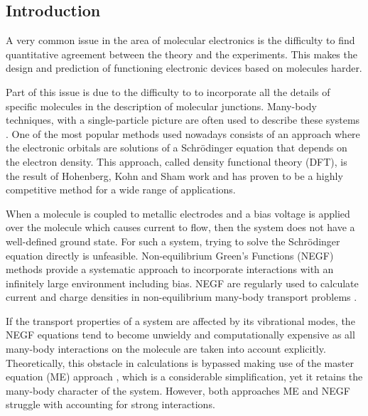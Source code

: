 \documentclass{article}
\begin{document}
\begin{multicols}{2}
        
    \section{Introduction}
        A very common issue in the area of molecular electronics is the difficulty to find quantitative agreement between the theory and the experiments. This makes the design and prediction of functioning electronic devices based on molecules harder.
        
        Part of this issue is due to the difficulty to to incorporate all the details of specific molecules in the description of molecular junctions. Many-body techniques, with a single-particle picture are often used to describe these systems \cite{Tsuneda2014}. One of the most popular methods used nowadays consists of an approach where the electronic orbitals are solutions of a Schr\"odinger equation that depends on the electron density. This approach, called density functional theory (DFT), is the result of Hohenberg, Kohn and Sham work \cite{Hohenberg1964, kohnsham, nobel1998} and has proven to be a highly competitive method for a wide range of applications.
        
        When a molecule is coupled to metallic electrodes and a bias voltage is applied over the molecule which causes current to flow, then the system does not have a well-defined ground state. For such a system, trying to solve the Schr\"odinger equation directly is unfeasible. Non-equilibrium Green's Functions (NEGF) methods provide a systematic approach to incorporate interactions with an infinitely large environment including bias. NEGF are regularly used to calculate current and charge densities in non-equilibrium many-body transport problems \cite{Mattuck1976, Jauho1994, Haug1997, Datta1997}. 
         
                
        If the transport properties of a system are affected by its vibrational modes, the NEGF equations tend to become unwieldy and computationally expensive as all many-body interactions on the molecule are taken into account explicitly. Theoretically, this obstacle in calculations is bypassed making use of the master equation (ME) approach \cite{beenakker}, which is a considerable simplification, yet it retains the many-body character of the system. However, both approaches ME and NEGF struggle with accounting for strong interactions.
        

\end{multicols}
\end{document}
